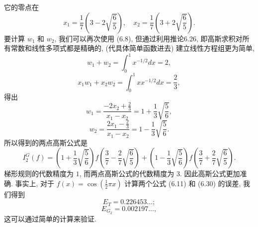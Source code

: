 \documentclass[a4paper]{ctexart}
\begin{document}
它的零点在
$$ 
x_1 = \frac{1}{7}\left(3 - 2\sqrt{\frac{6}{5}}\right), 
\quad x_2 = \frac{1}{7}\left(3 + 2\sqrt{\frac{6}{5}}\right). 
$$
要计算 $w_1$ 和 $w_2$, 我们可以再次使用 (6.8), 
但通过利用推论6.26, 即高斯求积对所有常数和线性多项式都是精确的, 
(代具体简单函数进去) 建立线性方程组更为简单, 
$$ 
w_1 + w_2 = \int_{0}^{1} x^{-1/2}dx = 2, 
$$
$$ 
x_1w_1 + x_2w_2 = \int_{0}^{1} xx^{-1/2}dx = \frac{2}{3}, 
$$
得出
$$ 
w_1 
= \frac{-2x_2 + \frac{2}{3}}{x_1 - x_2} 
= 1 + \frac{1}{3}\sqrt{\frac{5}{6}}, 
$$
$$ 
w_2 
= \frac{2x_1 - \frac{2}{3}}{x_1 - x_2} 
= 1 - \frac{1}{3}\sqrt{\frac{5}{6}}. 
$$
所以得到的两点高斯公式是
$$ 
I^G_2(f) 
= \left(1 + \frac{1}{3}\sqrt{\frac{5}{6}}\right)f\left(\frac{3}{7} 
- \frac{2}{7}\sqrt{\frac{6}{5}}\right) 
+ \left(1 - \frac{1}{3}\sqrt{\frac{5}{6}}\right)f\left(\frac{3}{7} 
+ \frac{2}{7}\sqrt{\frac{6}{5}}\right). 
$$ 
梯形规则的代数精度为 $1$, 而两点高斯公式的代数精度为 $3$. 
因此高斯公式更加准确. 
事实上, 对于 $f(x) = \cos\left(\frac{1}{2}\pi x\right)$ 计算两个公式 
(6.11) 和 (6.30) 的误差, 我们得到
$$ 
E_T = 0.226453\ldots; 
$$
$$ 
E_{G_2} = 0.002197\ldots, 
$$
这可以通过简单的计算来验证. 


\end{document}
